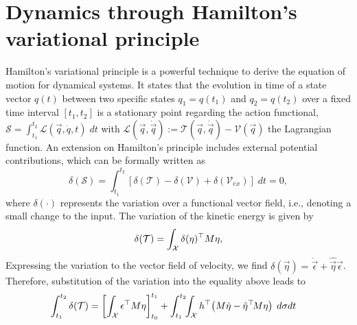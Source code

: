 

\newpage
\section{Dynamics through Hamilton's variational principle}
Hamilton's variational principle is a powerful technique to derive the equation of motion for dynamical systems. It states that the evolution in time of a state vector $q(t)$ between two specific states $q_1 = q(t_1)$ and $q_2 = q(t_2)$ over a fixed time interval $[t_1,t_2]$ is a stationary point regarding the action functional, $\mathcal{S} = \int_{t_1}^{t_2} \mathcal{L}(\vec{q},\dot{q},t) \; dt$ with $\mathcal{L}(\vec{q},\dot{\vec{q}}) := \mathcal{T}(\vec{q},\dot{\vec{q}}) - \mathcal{V}(\vec{q})$ the Lagrangian function. An extension on Hamilton's principle includes external potential contributions, which can be formally written as
\begin{equation}
\delta(\mathcal{S}) = \int_{t_1}^{t_2} \left[\delta(\mathcal{T}) - \delta(\mathcal{V}) + \delta(\mathcal{V}_{ex}) \right]\; dt = 0,
\end{equation}
where $\delta(\cdot)$ represents the variation over a functional vector field, i.e., denoting a small change to the input. The variation of the kinetic energy is given by
\begin{equation}
\delta(\mathcal{T}) = \int_{\mathcal{X}} \delta({\eta})^\top {M} {\eta}, \label{eq:c2_1.18}
\end{equation}
Expressing the variation to the vector field of velocity, we find $\delta(\vec{\eta}) = \dot{\vec{\epsilon}} + \hat{\vec{\eta}} \vec{\epsilon}$. Therefore, substitution of the variation into the equality above leads to 
\begin{align}
\int_{t_1}^{t_2} \delta(\mathcal{T}) & = 
\left[ \int_\mathcal{X} {\epsilon}^\top {M} {\eta} \right]_{t_0}^{t_1} +  \int_{t_1}^{t_2} \!\! \int_\mathcal{X}  {h}^\top \! \left( M\dot{{\eta}} - \hat{{\eta}}^\top \! M {\eta}\right)\; d\sigma dt
\end{align}

